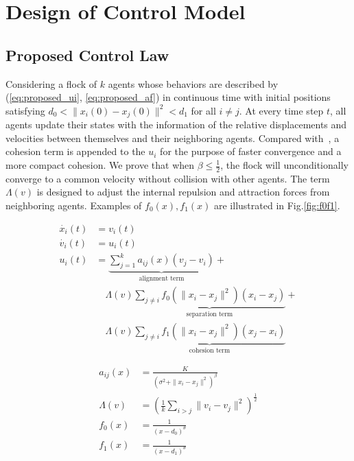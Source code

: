 \chapter{Design of Control Model}\label{design}

\section{Proposed Control Law}\label{control_law}

Considering a flock of $k$ agents whose behaviors are described by (\ref{eq:proposed_ui}, \ref{eq:proposed_af}) in continuous time with initial positions satisfying $d_0<\|x_i(0)-x_j(0)\|^2<d_1$ for all $i\neq j$. At every time step $t$, all agents update their states with the information of the relative displacements and velocities between themselves and their neighboring agents. Compared with~\cite{CuckerDong2010}, a cohesion term is appended to the $u_i$ for the purpose of faster convergence and a more compact cohesion. We prove that when $\beta\leq\frac{1}{2}$, the flock will unconditionally converge to a common velocity without collision with other agents. The term $\Lambda(v)$ is designed to adjust the internal repulsion and attraction forces from neighboring agents. Examples of $f_0(x), f_1(x)$ are illustrated in Fig.\ref{fig:f0f1}.

\begin{equation}\label{eq:proposed_ui}
\begin{aligned}
\dot{x_i}(t)&=v_i(t)\\
\dot{v_i}(t)&=u_i(t)\\
u_i(t)&=\underbrace{\sum^k_{j=1}a_{ij}(x)(v_j-v_i)}_{\text{alignment term}}+\\
&\quad\Lambda(v)\underbrace{\sum_{j\neq i}f_0(\|x_i-x_j\|^2)(x_i-x_j)}_{\text{separation term}}+\\
&\quad\Lambda(v)\underbrace{\sum_{j\neq i}f_1(\|x_i-x_j\|^2)(x_j-x_i)}_{\text{cohesion term}}
\end{aligned}
\end{equation}

\begin{equation}\label{eq:proposed_af}
\begin{aligned}
a_{ij}(x)&=\frac{K}{(\sigma^2+\|x_i-x_j\|^2)^{\beta}}\\
\Lambda(v)&=(\frac{1}{k}\sum_{i>j}\|v_i-v_j\|^2)^{\frac{1}{2}}\\
f_0(x)&=\frac{1}{(x-d_0)^{\theta}}\\
f_1(x)&=\frac{1}{(x-d_1)^{\theta}}
\end{aligned}
\end{equation}

